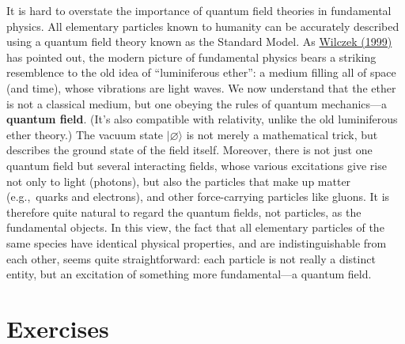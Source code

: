 \documentclass[pra,12pt]{revtex4}
\begin{document}
It is hard to overstate the importance of quantum field theories in
fundamental physics.  All elementary particles known to humanity can
be accurately described using a quantum field theory known as the
Standard Model.  As \hyperref[cite:wilczek]{Wilczek (1999)} has
pointed out, the modern picture of fundamental physics bears a
striking resemblence to the old idea of ``luminiferous ether'': a
medium filling all of space (and time), whose vibrations are light
waves.  We now understand that the ether is not a classical medium,
but one obeying the rules of quantum mechanics---a \textbf{quantum
  field}.  (It's also compatible with relativity, unlike the old
luminiferous ether theory.)  The vacuum state $|\varnothing\rangle$ is
not merely a mathematical trick, but describes the ground state of the
field itself.  Moreover, there is not just one quantum field but
several interacting fields, whose various excitations give rise not
only to light (photons), but also the particles that make up matter
(e.g.,~quarks and electrons), and other force-carrying particles like
gluons.  It is therefore quite natural to regard the quantum fields,
not particles, as the fundamental objects.  In this view, the fact
that all elementary particles of the same species have identical
physical properties, and are indistinguishable from each other, seems
quite straightforward: each particle is not really a distinct entity,
but an excitation of something more fundamental---a quantum field.

\section*{Exercises}
\end{document}
